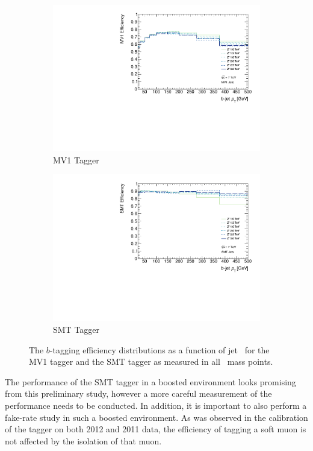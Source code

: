 \begin{figure}[tbhp]
  \centering
  \begin{subfigure}[b]{0.75\textwidth}
    \includegraphics[width=\textwidth]{PartBoosted/Plots/he_mv1_jet_pt.pdf}
    \caption{MV1 Tagger} \label{fig:BoostedBTaggMV1}
  \end{subfigure}
  
  \begin{subfigure}[b]{0.75\textwidth}
    \includegraphics[width=\textwidth]{PartBoosted/Plots/he_smt_jet_pt.pdf}
    \caption{SMT Tagger} \label{fig:BoostedBTaggSMT}
  \end{subfigure}
  \caption{The $b$-tagging efficiency distributions as a function of jet \pt\ for the MV1 tagger and the SMT tagger as measured in all \Zprime\ mass points.} \label{fig:BoostedBTaggEffs}
\end{figure}

The performance of the SMT tagger in a boosted environment looks promising from this preliminary study, however a more careful measurement of the performance needs to be conducted. In addition, it is important to also perform a fake-rate study in such a boosted environment. As was observed in the calibration of the tagger on both 2012 and 2011 data, the efficiency of tagging a soft muon is not affected by the isolation of that muon.
